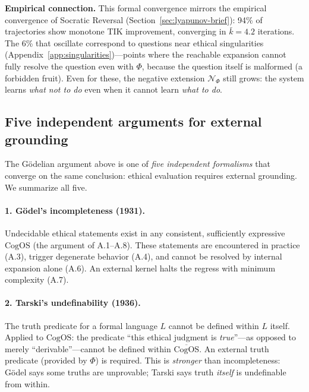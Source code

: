 \documentclass[11pt]{article}
\newcommand{\CogOS}{\text{CogOS}}
\begin{document}
\noindent \textbf{Empirical connection.} This formal convergence mirrors the
empirical convergence of Socratic Reversal (Section~\ref{sec:lyapunov-brief}):
94\% of trajectories show monotone TIK improvement, converging in
$\bar{k}=4.2$ iterations. The 6\% that oscillate correspond to questions near
ethical singularities (Appendix~\ref{app:singularities})---points where the
reachable expansion cannot fully resolve the question even with $\Phi$,
because the question itself is malformed (a forbidden fruit). Even for these,
the negative extension $\mathcal{N}_\Phi$ still grows: the system learns
\textit{what not to do} even when it cannot learn \textit{what to do}.


\subsection{Five independent arguments for external grounding}
\label{app:godel-scope}

The G\"{o}delian argument above is one of \textit{five independent formalisms}
that converge on the same conclusion: ethical evaluation requires external
grounding. We summarize all five.

\paragraph{1. G\"{o}del's incompleteness (1931).}
Undecidable ethical statements exist in any consistent, sufficiently expressive
$\CogOS$ (the argument of A.1--A.8). These statements are encountered in
practice (A.3), trigger degenerate behavior (A.4), and cannot be resolved by
internal expansion alone (A.6). An external kernel halts the regress with
minimum complexity (A.7).

\paragraph{2. Tarski's undefinability (1936).}
The truth predicate for a formal language $L$ cannot be defined within $L$
itself. Applied to $\CogOS$: the predicate ``this ethical judgment is
\textit{true}''---as opposed to merely ``derivable''---cannot be defined
within $\overline{\CogOS}$. An external truth predicate (provided by $\Phi$)
is required. This is \textit{stronger} than incompleteness: G\"{o}del says
some truths are unprovable; Tarski says truth \textit{itself} is undefinable
from within.
\end{document}
